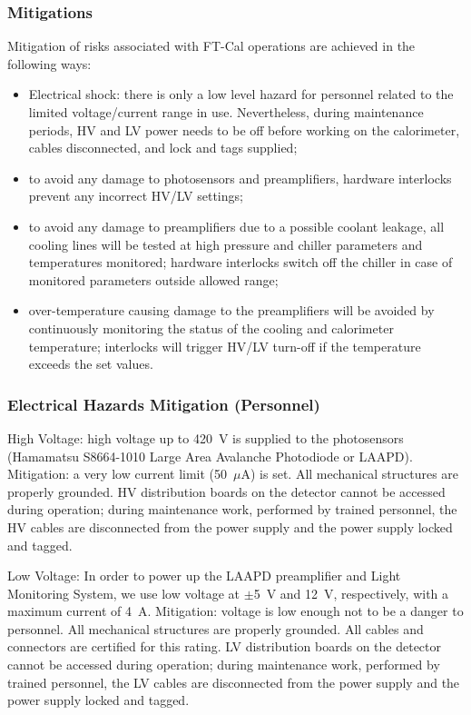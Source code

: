\subsubsection{Mitigations}

Mitigation of risks associated with FT-Cal operations are achieved in the following ways:

\begin{itemize}
\item {Electrical shock: there is only a low level hazard for personnel related to the limited 
voltage/current range in use. Nevertheless, during maintenance periods,  HV and LV  power needs 
to be off before working on the calorimeter, cables disconnected, and lock and tags supplied;}
\item  {to avoid any damage to photosensors and preamplifiers, hardware  interlocks prevent 
any incorrect HV/LV settings; }
\item  {to avoid any damage to preamplifiers due to a possible coolant leakage, all cooling 
lines will be tested at high pressure and chiller parameters and temperatures monitored; 
hardware interlocks switch off the chiller in case of monitored parameters outside 
allowed range; }
\item {over-temperature causing damage to the preamplifiers will be avoided by continuously 
monitoring the status of the cooling and calorimeter temperature; interlocks will trigger HV/LV 
turn-off if the temperature exceeds the set values.}
\end{itemize}

\subsubsection{Electrical Hazards Mitigation (Personnel)}

High Voltage: high voltage up to 420~V is supplied to the photosensors (Hamamatsu S8664-1010 
Large Area Avalanche Photodiode or LAAPD). Mitigation: a very low current limit (50~$\mu$A) is 
set. All mechanical structures are properly grounded. HV distribution boards on the detector 
cannot be accessed during operation; during maintenance work, performed by trained personnel, 
the HV cables are disconnected from the power supply and the power supply locked and tagged.

Low Voltage: In order to power up the LAAPD preamplifier and Light Monitoring System, we use 
low voltage at $\pm$5~V and 12~V, respectively, with a maximum current of 4~A. Mitigation: 
voltage is low enough not to be a danger to personnel. All mechanical structures are properly 
grounded. All cables and connectors are certified for this rating. LV distribution boards on 
the detector cannot be accessed during operation; during maintenance work, performed by trained 
personnel, the LV cables are disconnected from the power supply and the power supply locked and 
tagged.

